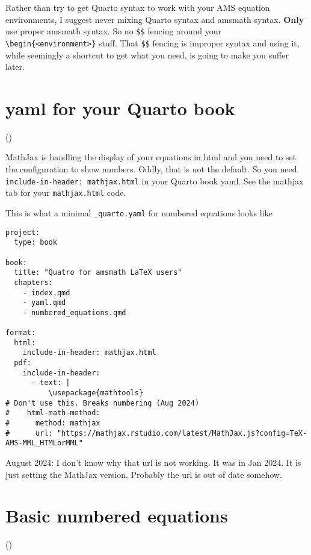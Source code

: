 \documentclass[
  letterpaper,
  DIV=11,
  numbers=noendperiod]{scrreprt}
\begin{document}
Rather than try to get Quarto syntax to work with your AMS equation
environments, I suggest never mixing Quarto syntax and amsmath syntax.
\textbf{Only} use proper amsmath syntax. So no \texttt{\$\$} fencing
around your
\texttt{\textbackslash{}begin\{\textless{}environment\textgreater{}\}}
stuff. That \texttt{\$\$} fencing is improper syntax and using it, while
seemingly a shortcut to get what you need, is going to make you suffer
later.


\chapter{yaml for your Quarto book}\label{yaml-for-your-quarto-book}

{(\nextSection)}

MathJax is handling the display of your equations in html and you need
to set the configuration to show numbers. Oddly, that is not the
default. So you need \texttt{include-in-header:\ mathjax.html} in your
Quarto book yaml. See the mathjax tab for your \texttt{mathjax.html}
code.

This is what a minimal \texttt{\_quarto.yaml} for numbered equations
looks like

\begin{verbatim}
project:
  type: book

book:
  title: "Quatro for amsmath LaTeX users"
  chapters:
    - index.qmd
    - yaml.qmd
    - numbered_equations.qmd

format:
  html:
    include-in-header: mathjax.html
  pdf:
    include-in-header:
      - text: |
          \usepackage{mathtools}
# Don't use this. Breaks numbering (Aug 2024)
#    html-math-method:
#      method: mathjax
#      url: "https://mathjax.rstudio.com/latest/MathJax.js?config=TeX-AMS-MML_HTMLorMML"
\end{verbatim}

August 2024: I don't know why that url is not working. It was in Jan
2024. It is just setting the MathJax version. Probably the url is out of
date somehow.


\chapter{Basic numbered equations}\label{basic-numbered-equations}

{(\nextSection)}
\end{document}
